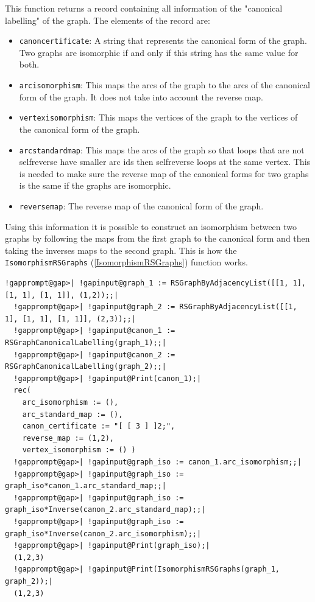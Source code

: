 \documentclass[a4paper,11pt]{report}
\begin{document}
{{{ This function returns a record containing all information of the "canonical
labelling" of the graph. The elements of the record are: 
\begin{itemize}
\item  \texttt{canon{\textunderscore}certificate}: A string that represents the canonical form of the graph. Two graphs are
isomorphic if and only if this string has the same value for both. 
\item  \texttt{arc{\textunderscore}isomorphism}: This maps the arcs of the graph to the arcs of the canonical form of the
graph. It does not take into account the reverse map. 
\item  \texttt{vertex{\textunderscore}isomorphism}: This maps the vertices of the graph to the vertices of the canonical form of
the graph. 
\item  \texttt{arc{\textunderscore}standard{\textunderscore}map}: This maps the arcs of the graph so that loops that are not
self\texttt{}reverse have smaller arc ids then
self\texttt{}reverse loops at the same vertex. This is needed to
make sure the reverse map of the canonical forms for two graphs is the same if
the graphs are isomorphic. 
\item  \texttt{reverse{\textunderscore}map}: The reverse map of the canonical form of the graph. 
\end{itemize}
 

 Using this information it is possible to construct an isomorphism between two
graphs by following the maps from the first graph to the canonical form and
then taking the inverses maps to the second graph. This is how the \texttt{IsomorphismRSGraphs} (\ref{IsomorphismRSGraphs}) function works. }

 
\begin{Verbatim}[commandchars=!@|,fontsize=\small,frame=single,label=Example]
  !gapprompt@gap>| !gapinput@graph_1 := RSGraphByAdjacencyList([[1, 1], [1, 1], [1, 1]], (1,2));;|
  !gapprompt@gap>| !gapinput@graph_2 := RSGraphByAdjacencyList([[1, 1], [1, 1], [1, 1]], (2,3));;|
  !gapprompt@gap>| !gapinput@canon_1 := RSGraphCanonicalLabelling(graph_1);;|
  !gapprompt@gap>| !gapinput@canon_2 := RSGraphCanonicalLabelling(graph_2);;|
  !gapprompt@gap>| !gapinput@Print(canon_1);|
  rec(
    arc_isomorphism := (),
    arc_standard_map := (),
    canon_certificate := "[ [ 3 ] ]2;",
    reverse_map := (1,2),
    vertex_isomorphism := () )
  !gapprompt@gap>| !gapinput@graph_iso := canon_1.arc_isomorphism;;|
  !gapprompt@gap>| !gapinput@graph_iso := graph_iso*canon_1.arc_standard_map;;|
  !gapprompt@gap>| !gapinput@graph_iso := graph_iso*Inverse(canon_2.arc_standard_map);;|
  !gapprompt@gap>| !gapinput@graph_iso := graph_iso*Inverse(canon_2.arc_isomorphism);;|
  !gapprompt@gap>| !gapinput@Print(graph_iso);|
  (1,2,3)
  !gapprompt@gap>| !gapinput@Print(IsomorphismRSGraphs(graph_1, graph_2));|
  (1,2,3)
\end{Verbatim}
 

}}
\end{document}
